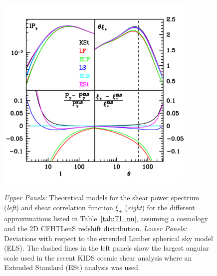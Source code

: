  \begin{figure}
 \begin{center}
 \includegraphics[width=0.85\textwidth]{figures/Cl_xi_comp.pdf}
 \label{fig:Cl_xi}
 \caption{\emph{Upper Panels:} Theoretical models for the shear power spectrum (\emph{left}) and shear correlation function $\xi_+$ (\emph{right}) for the different approximations listed in Table~\ref{tab:Tl_nu}, assuming a \citet{planck/cosmo:2015} cosmology and the 2D CFHTLenS redshift distribution. \emph{Lower Panels:} Deviations with respect to the extended Limber spherical sky model (ELS).    The dashed lines in the left panels show the largest angular scale used in the recent KIDS cosmic shear analysis where an Extended Standard (ESt) analysis was used.}
 \end{center}
 \end{figure}
 

